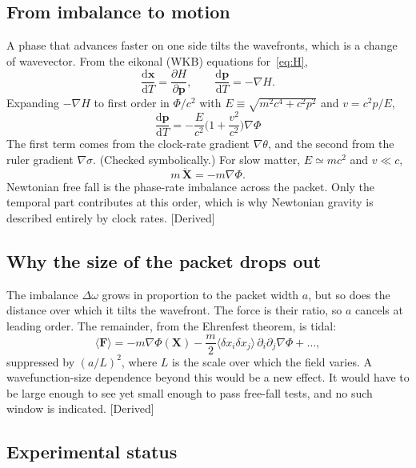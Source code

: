 \documentclass[11pt]{article}
\newcommand{\thP}{\theta}
\newcommand{\sgP}{\sigma}
\newcommand{\dd}{\mathrm{d}}
\newcommand{\st}[1]{\textsf{\small[#1]}}
\theoremstyle{plain}
\theoremstyle{remark}
\begin{document}
\subsection{From imbalance to motion}

A phase that advances faster on one side tilts the wavefronts, which is a change of wavevector. From the eikonal (WKB) equations for~\eqref{eq:H},
\begin{equation}
\frac{\dd\mathbf x}{\dd T}=\frac{\partial H}{\partial\mathbf p},\qquad
\frac{\dd\mathbf p}{\dd T}=-\nabla H .
\label{eq:Hamilton}
\end{equation}
Expanding $-\nabla H$ to first order in $\Phi/c^2$ with $E\equiv\sqrt{m^2c^4+c^2p^2}$ and $v=c^2p/E$,
\begin{equation}
\boxed{\;\frac{\dd\mathbf p}{\dd T}=-\frac{E}{c^2}\Big(1+\frac{v^2}{c^2}\Big)\nabla\Phi\;}
\label{eq:force}
\end{equation}
The first term comes from the clock-rate gradient $\nabla\thP$, and the second from the ruler gradient $\nabla\sgP$. (Checked symbolically.) For slow matter, $E\simeq mc^2$ and $v\ll c$,
\begin{equation}
m\,\ddot{\mathbf X}=-m\nabla\Phi .
\end{equation}
Newtonian free fall is the phase-rate imbalance across the packet. Only the temporal part contributes at this order, which is why Newtonian gravity is described entirely by clock rates. \st{Derived}

\subsection{Why the size of the packet drops out}

The imbalance $\Delta\omega$ grows in proportion to the packet width $a$, but so does the distance over which it tilts the wavefront. The force is their ratio, so $a$ cancels at leading order. The remainder, from the Ehrenfest theorem, is tidal:
\begin{equation}
\langle\mathbf F\rangle=-m\nabla\Phi(\mathbf X)-\frac{m}{2}\langle\delta x_i\delta x_j\rangle\,\partial_i\partial_j\nabla\Phi+\dots,
\end{equation}
suppressed by $(a/L)^2$, where $L$ is the scale over which the field varies. A wavefunction-size dependence beyond this would be a new effect. It would have to be large enough to see yet small enough to pass free-fall tests, and no such window is indicated. \st{Derived}

\subsection{Experimental status}
\end{document}
